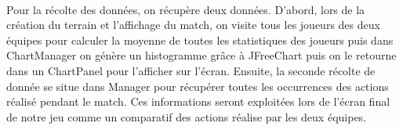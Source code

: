 \paragraph{}
    Pour la récolte des données, on récupère deux données. D'abord, lors de la création du terrain et l'affichage du match, on visite tous les joueurs des deux équipes pour calculer la moyenne de toutes les statistiques des joueurs puis dans ChartManager on génère un histogramme grâce à JFreeChart puis on le retourne dans un ChartPanel pour l'afficher sur l'écran. Ensuite, la seconde récolte de donnée se situe dans Manager pour récupérer toutes les occurrences des actions réalisé pendant le match. Ces informations seront exploitées lors de l'écran final de notre jeu comme un comparatif des actions réalise par les deux équipes.
    